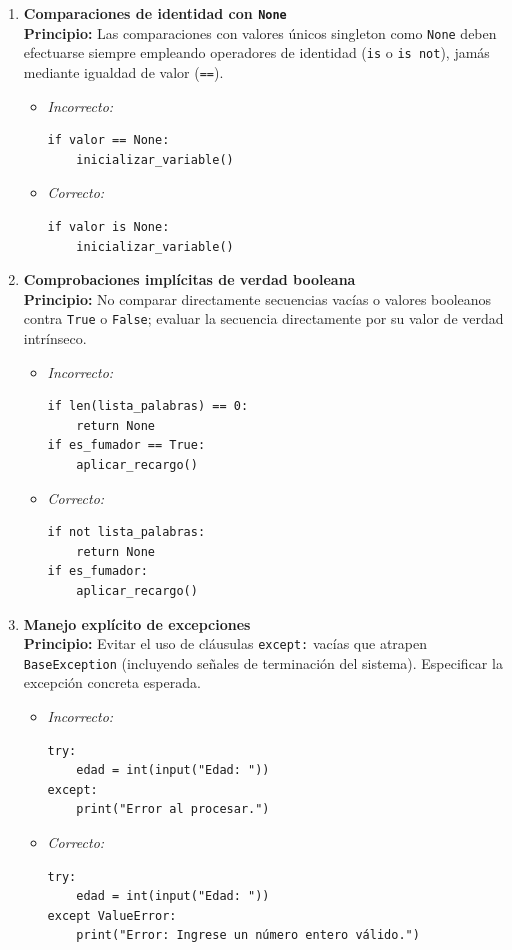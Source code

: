 \documentclass[12pt, letterpaper]{article}
\begin{document}
\begin{enumerate}
\begin{itemize}
\begin{verbatim}
class FactorEdad:
    def calcular_factor(self, edad_asegurado):
        pass
\end{verbatim}
    \end{itemize}

    \item \textbf{Comparaciones de identidad con \texttt{None}} \\
    \textbf{Principio:} Las comparaciones con valores únicos singleton como \texttt{None} deben efectuarse siempre empleando operadores de identidad (\texttt{is} o \texttt{is not}), jamás mediante igualdad de valor (\texttt{==}).
    \begin{itemize}
        \item \textit{Incorrecto:}
\begin{verbatim}
if valor == None:
    inicializar_variable()
\end{verbatim}
        \item \textit{Correcto:}
\begin{verbatim}
if valor is None:
    inicializar_variable()
\end{verbatim}
    \end{itemize}

    \item \textbf{Comprobaciones implícitas de verdad booleana} \\
    \textbf{Principio:} No comparar directamente secuencias vacías o valores booleanos contra \texttt{True} o \texttt{False}; evaluar la secuencia directamente por su valor de verdad intrínseco.
    \begin{itemize}
        \item \textit{Incorrecto:}
\begin{verbatim}
if len(lista_palabras) == 0:
    return None
if es_fumador == True:
    aplicar_recargo()
\end{verbatim}
        \item \textit{Correcto:}
\begin{verbatim}
if not lista_palabras:
    return None
if es_fumador:
    aplicar_recargo()
\end{verbatim}
    \end{itemize}

    \item \textbf{Manejo explícito de excepciones} \\
    \textbf{Principio:} Evitar el uso de cláusulas \texttt{except:} vacías que atrapen \texttt{BaseException} (incluyendo señales de terminación del sistema). Especificar la excepción concreta esperada.
    \begin{itemize}
        \item \textit{Incorrecto:}
\begin{verbatim}
try:
    edad = int(input("Edad: "))
except:
    print("Error al procesar.")
\end{verbatim}
        \item \textit{Correcto:}
\begin{verbatim}
try:
    edad = int(input("Edad: "))
except ValueError:
    print("Error: Ingrese un número entero válido.")
\end{verbatim}
    \end{itemize}


\end{enumerate}
\end{document}
